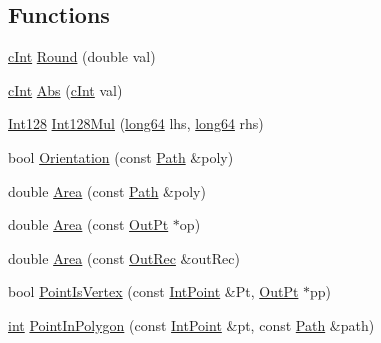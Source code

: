 \subsection*{Functions}
\begin{DoxyCompactItemize}
\item 
\mbox{\hyperlink{namespace_clipper_lib_a7156730a24951629192d4831334bafaa}{c\+Int}} \mbox{\hyperlink{namespace_clipper_lib_a6635b2c24fa0147ff4ecab56d80e7293}{Round}} (double val)
\item 
\mbox{\hyperlink{namespace_clipper_lib_a7156730a24951629192d4831334bafaa}{c\+Int}} \mbox{\hyperlink{namespace_clipper_lib_ad29f252d45c594ccd3030cf966baa2e4}{Abs}} (\mbox{\hyperlink{namespace_clipper_lib_a7156730a24951629192d4831334bafaa}{c\+Int}} val)
\item 
\mbox{\hyperlink{class_clipper_lib_1_1_int128}{Int128}} \mbox{\hyperlink{namespace_clipper_lib_a54fd38efeb2ae1bb84d1390bff3cf6bc}{Int128\+Mul}} (\mbox{\hyperlink{namespace_clipper_lib_a7fd564bf34d174b6c96e07d01e5e7a0a}{long64}} lhs, \mbox{\hyperlink{namespace_clipper_lib_a7fd564bf34d174b6c96e07d01e5e7a0a}{long64}} rhs)
\item 
bool \mbox{\hyperlink{namespace_clipper_lib_a806a3d33d76bb9d4479d384f876ce8bd}{Orientation}} (const \mbox{\hyperlink{namespace_clipper_lib_af39c8fe00f278f18cc8142fef41242da}{Path}} \&poly)
\item 
double \mbox{\hyperlink{namespace_clipper_lib_a4a96cc48117e1dba6cf51bbc2d91fe97}{Area}} (const \mbox{\hyperlink{namespace_clipper_lib_af39c8fe00f278f18cc8142fef41242da}{Path}} \&poly)
\item 
double \mbox{\hyperlink{namespace_clipper_lib_afb282ff102fcfdf7b36b7b9101060f04}{Area}} (const \mbox{\hyperlink{struct_clipper_lib_1_1_out_pt}{Out\+Pt}} $\ast$op)
\item 
double \mbox{\hyperlink{namespace_clipper_lib_ae138536c4535e0a97e2e5787ae41bac3}{Area}} (const \mbox{\hyperlink{struct_clipper_lib_1_1_out_rec}{Out\+Rec}} \&out\+Rec)
\item 
bool \mbox{\hyperlink{namespace_clipper_lib_aa0616b922b887c38de1f2af2eee82357}{Point\+Is\+Vertex}} (const \mbox{\hyperlink{struct_clipper_lib_1_1_int_point}{Int\+Point}} \&Pt, \mbox{\hyperlink{struct_clipper_lib_1_1_out_pt}{Out\+Pt}} $\ast$pp)
\item 
\mbox{\hyperlink{draw_8hh_aa620a13339ac3a1177c86edc549fda9b}{int}} \mbox{\hyperlink{namespace_clipper_lib_ac7314f2a1f45c627bac20e9ba2a68212}{Point\+In\+Polygon}} (const \mbox{\hyperlink{struct_clipper_lib_1_1_int_point}{Int\+Point}} \&pt, const \mbox{\hyperlink{namespace_clipper_lib_af39c8fe00f278f18cc8142fef41242da}{Path}} \&path)

\end{DoxyCompactItemize}
